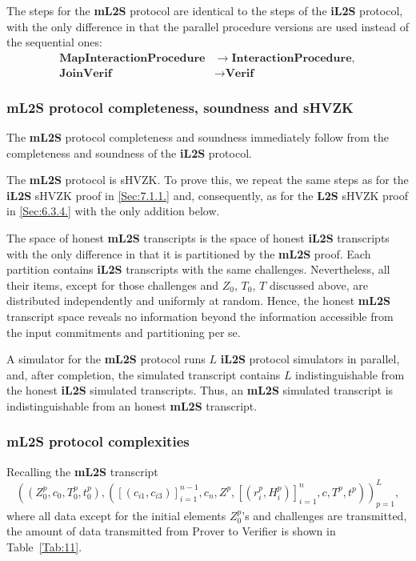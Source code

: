 \documentclass{mathcryptology} %
\theoremstyle{title}
\theoremstyle{titleof}
\begin{document}
    The steps for the \textbf{mL2S} protocol are identical to the steps of the \textbf{iL2S} protocol, with the only difference in that the parallel procedure versions are used instead of the sequential ones:
    \begin{align*}
        \textbf{MapInteractionProcedure} & \rightarrow \textbf{InteractionProcedure},\\
        \textbf{JoinVerif} & \rightarrow \textbf{Verif}
    \end{align*}


\subsubsection{mL2S protocol completeness, soundness and sHVZK}
    The \textbf{mL2S} protocol completeness and soundness immediately follow from the completeness and soundness of the \textbf{iL2S} protocol.

    The \textbf{mL2S} protocol is sHVZK. To prove this, we repeat the same steps as for the \textbf{iL2S} sHVZK proof in \ref{Sec:7.1.1.} and, consequently, as for the \textbf{L2S} sHVZK proof in \ref{Sec:6.3.4.} with the only addition below.

    The space of honest \textbf{mL2S} transcripts is the space of honest \textbf{iL2S} transcripts with the only difference in that it is partitioned by the \textbf{mL2S} proof. Each partition contains \textbf{iL2S} transcripts with the same challenges. Nevertheless, all their items, except for those challenges and $Z_{0}$, $T_{0}$, $T$ discussed above, are distributed independently and uniformly at random. Hence, the honest \textbf{mL2S} transcript space reveals no information beyond the information accessible from the input commitments and partitioning per se.

    A simulator for the \textbf{mL2S} protocol runs $L$ \textbf{iL2S} protocol simulators in parallel, and, after completion, the simulated transcript contains $L$ indistinguishable from the honest \textbf{iL2S} simulated transcripts. Thus, an \textbf{mL2S} simulated transcript is indistinguishable from an honest \textbf{mL2S} transcript.


\subsubsection{mL2S protocol complexities}
    Recalling the \textbf{mL2S} transcript
    \begin{equation*}
        {\left(\left(Z_{0}^{p},c_{0},T_{0}^{p},t_{0}^{p}\right),\left({\left[\left(c_{i1},c_{i3}\right)\right]}_{i=1}^{n-1},
            c_{n}, Z^{p}, {\left[\left(r_{i}^{p},H_{i}^{p}\right)\right]}_{i=1}^n,
            c,T^{p},t^{p}\right)\right)}_{p=1}^{L},
    \end{equation*}
    where all data except for the initial elements $Z_{0}^{p}$'s and challenges are transmitted, the amount of data transmitted from Prover to Verifier is shown in Table~\ref{Tab:11}.
\end{document}
